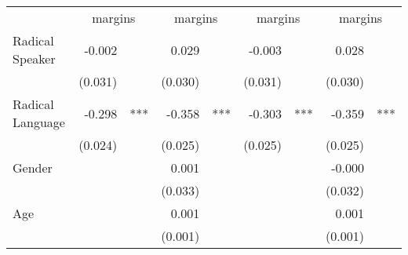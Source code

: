 \documentclass{article}
\begin{document}
\begin{table}[!h]
\centering
\begin{tabular}{lllllllll}
\cline{1-9}
\multicolumn{1}{r}{} &
  \multicolumn{2}{c}{margins} &
  \multicolumn{2}{c}{margins} &
  \multicolumn{2}{c}{margins} &
  \multicolumn{2}{c}{margins} \\
\cline{1-9}
\multicolumn{1}{l}{Radical Speaker} &
  \multicolumn{1}{r}{-0.002} &
  \multicolumn{1}{l}{} &
  \multicolumn{1}{r}{0.029} &
  \multicolumn{1}{l}{} &
  \multicolumn{1}{r}{-0.003} &
  \multicolumn{1}{l}{} &
  \multicolumn{1}{r}{0.028} &
  \multicolumn{1}{l}{} \\
\multicolumn{1}{l}{} &
  \multicolumn{1}{r}{(0.031)} &
  \multicolumn{1}{l}{} &
  \multicolumn{1}{r}{(0.030)} &
  \multicolumn{1}{l}{} &
  \multicolumn{1}{r}{(0.031)} &
  \multicolumn{1}{l}{} &
  \multicolumn{1}{r}{(0.030)} &
  \multicolumn{1}{l}{} \\
\multicolumn{1}{l}{Radical Language} &
  \multicolumn{1}{r}{-0.298} &
  \multicolumn{1}{l}{***} &
  \multicolumn{1}{r}{-0.358} &
  \multicolumn{1}{l}{***} &
  \multicolumn{1}{r}{-0.303} &
  \multicolumn{1}{l}{***} &
  \multicolumn{1}{r}{-0.359} &
  \multicolumn{1}{l}{***} \\
\multicolumn{1}{l}{} &
  \multicolumn{1}{r}{(0.024)} &
  \multicolumn{1}{l}{} &
  \multicolumn{1}{r}{(0.025)} &
  \multicolumn{1}{l}{} &
  \multicolumn{1}{r}{(0.025)} &
  \multicolumn{1}{l}{} &
  \multicolumn{1}{r}{(0.025)} &
  \multicolumn{1}{l}{} \\
\multicolumn{1}{l}{Gender} &
  \multicolumn{1}{r}{} &
  \multicolumn{1}{l}{} &
  \multicolumn{1}{r}{0.001} &
  \multicolumn{1}{l}{} &
  \multicolumn{1}{r}{} &
  \multicolumn{1}{l}{} &
  \multicolumn{1}{r}{-0.000} &
  \multicolumn{1}{l}{} \\
\multicolumn{1}{l}{} &
  \multicolumn{1}{r}{} &
  \multicolumn{1}{l}{} &
  \multicolumn{1}{r}{(0.033)} &
  \multicolumn{1}{l}{} &
  \multicolumn{1}{r}{} &
  \multicolumn{1}{l}{} &
  \multicolumn{1}{r}{(0.032)} &
  \multicolumn{1}{l}{} \\
\multicolumn{1}{l}{Age} &
  \multicolumn{1}{r}{} &
  \multicolumn{1}{l}{} &
  \multicolumn{1}{r}{0.001} &
  \multicolumn{1}{l}{} &
  \multicolumn{1}{r}{} &
  \multicolumn{1}{l}{} &
  \multicolumn{1}{r}{0.001} &
  \multicolumn{1}{l}{} \\
\multicolumn{1}{l}{} &
  \multicolumn{1}{r}{} &
  \multicolumn{1}{l}{} &
  \multicolumn{1}{r}{(0.001)} &
  \multicolumn{1}{l}{} &
  \multicolumn{1}{r}{} &
  \multicolumn{1}{l}{} &
  \multicolumn{1}{r}{(0.001)} &

\end{tabular}
\end{table}
\end{document}
